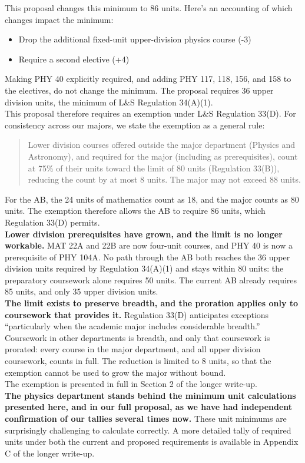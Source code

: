 \documentclass[12pt]{article}
\begin{document}
\noindent
This proposal changes this minimum to 86 units.  Here's an
accounting of which changes impact the minimum:
\begin{itemize}
\item Drop the additional fixed-unit upper-division physics course (-3)
\item Require a second elective (+4)
\end{itemize}
Making PHY 40 explicitly required, and adding PHY 117, 118, 156, and
158 to the electives, do not change the minimum.  The proposal
requires 36 upper division units, the minimum of L\&S Regulation
34(A)(1).\\[5pt]

\noindent
This proposal therefore requires an exemption under L\&S Regulation
33(D).  For consistency across our majors, we state the exemption as a
general rule:
\begin{quote}
  Lower division courses offered outside the major department (Physics and
  Astronomy), and required for the major (including as prerequisites),
  count at 75\% of their units toward the limit of 80 units
  (Regulation 33(B)), reducing the count by at most 8 units.  The major
  may not exceed 88 units.
\end{quote}
For the AB, the 24 units of mathematics count as 18, and the major
counts as 80 units.  The exemption therefore allows the AB to require
86 units, which Regulation 33(D) permits.\\[5pt]

\noindent
{\bf Lower division prerequisites have grown, and the limit is no
  longer workable.}  MAT 22A and 22B are now four-unit courses, and
PHY 40 is now a prerequisite of PHY 104A.  No path through the AB both
reaches the 36 upper division units required by Regulation 34(A)(1)
and stays within 80 units:  the preparatory coursework alone requires
50 units.  The current AB already requires 85 units, and only 35 upper
division units.\\[5pt]

\noindent
{\bf The limit exists to preserve breadth, and the proration applies
  only to coursework that provides it.}  Regulation 33(D) anticipates
exceptions ``particularly when the academic major includes
considerable breadth.''  Coursework in other departments is breadth,
and only that coursework is prorated:  every course in the major
department, and all upper division coursework, counts in full.  The
reduction is limited to 8 units, so that the exemption cannot be used
to grow the major without bound.\\[5pt]

\noindent
The exemption is presented in full in Section 2 of the longer write-up.\\[5pt]

\noindent
{\bf The physics department stands behind the minimum unit
  calculations presented here, and in our full proposal, as we have
  had independent confirmation of our tallies several times now.}
These unit minimums are surprisingly challenging to calculate
correctly.  A more detailed tally of required units under both the
current and proposed requirements is available in Appendix C of the
longer write-up.
\end{document}
